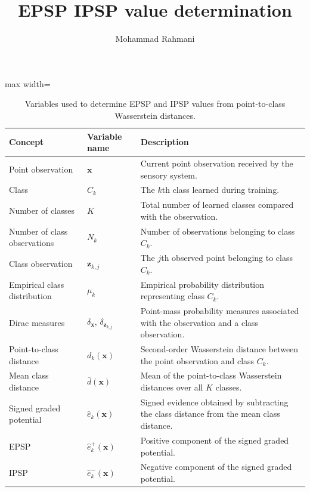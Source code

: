 \documentclass[a4paper]{article}
\title{EPSP IPSP value determination}
\date{}
\author{Mohammad Rahmani}
\begin{document}
   \maketitle

   \begin{table}[H]
      \centering
      \small
      \setlength{\tabcolsep}{4pt}
      \begin{adjustbox}{max width=\textwidth}
      \begin{tabular}{p{} p{} p{}}
         \hline
         \textbf{Concept} & \textbf{Variable name} & \textbf{Description} \\
         \hline
         Point observation & $\mathbf{x}$ & Current point observation received by the sensory system. \\
         Class & $C_k$ & The $k$th class learned during training. \\
         Number of classes & $K$ & Total number of learned classes compared with the observation. \\
         Number of class observations & $N_k$ & Number of observations belonging to class $C_k$. \\
         Class observation & $\mathbf{z}_{k,j}$ & The $j$th observed point belonging to class $C_k$. \\
         Empirical class distribution & $\mu_k$ & Empirical probability distribution representing class $C_k$. \\
         Dirac measures & $\delta_{\mathbf{x}},\,\delta_{\mathbf{z}_{k,j}}$ & Point-mass probability measures associated with the observation and a class observation. \\
         Point-to-class distance & $d_k(\mathbf{x})$ & Second-order Wasserstein distance between the point observation and class $C_k$. \\
         Mean class distance & $\bar d(\mathbf{x})$ & Mean of the point-to-class Wasserstein distances over all $K$ classes. \\
         Signed graded potential & $\hat e_k(\mathbf{x})$ & Signed evidence obtained by subtracting the class distance from the mean class distance. \\
         EPSP & $\hat e_k^{+}(\mathbf{x})$ & Positive component of the signed graded potential. \\
         IPSP & $\hat e_k^{-}(\mathbf{x})$ & Negative component of the signed graded potential. \\
         \hline
      \end{tabular}
      \end{adjustbox}
      \caption{Variables used to determine EPSP and IPSP values from point-to-class Wasserstein distances.}
      \label{table_epsp_ipsp_value_determination}
   \end{table}

   
   
\end{document}
